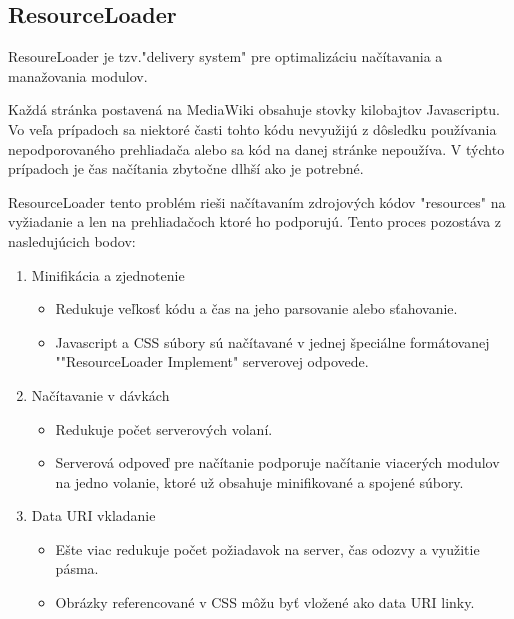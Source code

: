 \begin{itemize}
\subsection{ResourceLoader}

ResoureLoader je tzv."delivery system" pre optimalizáciu načítavania a manažovania modulov.

Každá stránka postavená na MediaWiki obsahuje stovky kilobajtov Javascriptu. Vo veľa prípadoch sa niektoré časti tohto kódu nevyužijú z dôsledku používania nepodporovaného prehliadača alebo sa kód na danej stránke nepoužíva. V týchto prípadoch je čas načítania zbytočne dlhší ako je potrebné.

ResourceLoader tento problém rieši načítavaním zdrojových kódov "resources" na vyžiadanie a len na prehliadačoch ktoré ho podporujú. Tento proces pozostáva z nasledujúcich bodov:

\begin{enumerate}
	\item Minifikácia a zjednotenie
	\begin{itemize}
		\item Redukuje veľkosť kódu a čas na jeho parsovanie alebo sťahovanie. 
		\item Javascript a CSS súbory sú načítavané v jednej špeciálne formátovanej ""ResourceLoader Implement" serverovej odpovede.
	\end{itemize}
	\item Načítavanie v dávkách
	\begin{itemize}
		\item Redukuje počet serverových volaní.
		\item Serverová odpoveď pre načítanie podporuje načítanie viacerých modulov na jedno volanie, ktoré už obsahuje minifikované a spojené súbory.
	\end{itemize}
	\item Data URI vkladanie
	\begin{itemize}
		\item Ešte viac redukuje počet požiadavok na server, čas odozvy a využitie pásma.
		\item Obrázky referencované v CSS môžu byť vložené ako data URI linky.
	\end{itemize}
\end{enumerate}



\end{itemize}
